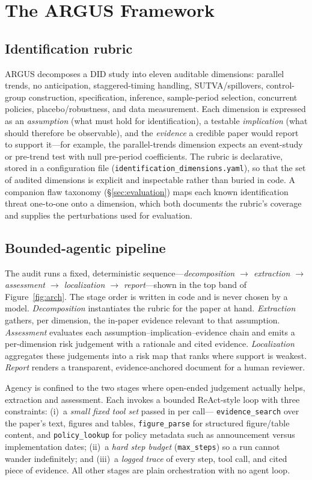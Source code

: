 \section{The ARGUS Framework}
\label{sec:framework}

\subsection{Identification rubric}
ARGUS decomposes a DID study into eleven auditable dimensions: parallel trends,
no anticipation, staggered-timing handling, SUTVA/spillovers, control-group
construction, specification, inference, sample-period selection, concurrent
policies, placebo/robustness, and data measurement. Each dimension is expressed
as an \emph{assumption} (what must hold for identification), a testable
\emph{implication} (what should therefore be observable), and the
\emph{evidence} a credible paper would report to support it---for example, the
parallel-trends dimension expects an event-study or pre-trend test with null
pre-period coefficients. The rubric is declarative, stored in a configuration
file (\texttt{identification\_dimensions.yaml}), so that the set of audited
dimensions is explicit and inspectable rather than buried in code. A companion
flaw taxonomy (\S\ref{sec:evaluation}) maps each known identification threat
one-to-one onto a dimension, which both documents the rubric's coverage and
supplies the perturbations used for evaluation.

\subsection{Bounded-agentic pipeline}
The audit runs a fixed, deterministic sequence---\emph{decomposition
$\rightarrow$ extraction $\rightarrow$ assessment $\rightarrow$ localization
$\rightarrow$ report}---shown in the top band of Figure~\ref{fig:arch}. The stage
order is written in code and is never chosen by a model. \emph{Decomposition}
instantiates the rubric for the paper at hand. \emph{Extraction} gathers, per
dimension, the in-paper evidence relevant to that assumption. \emph{Assessment}
evaluates each assumption--implication--evidence chain and emits a per-dimension
risk judgement with a rationale and cited evidence. \emph{Localization}
aggregates these judgements into a risk map that ranks where support is weakest.
\emph{Report} renders a transparent, evidence-anchored document for a human
reviewer.

Agency is confined to the two stages where open-ended judgement actually helps,
extraction and assessment. Each invokes a bounded ReAct-style loop with three
constraints: (i)~a \emph{small fixed tool set} passed in per call---%
\texttt{evidence\_search} over the paper's text, figures and tables,
\texttt{figure\_parse} for structured figure/table content, and
\texttt{policy\_lookup} for policy metadata such as announcement versus
implementation dates; (ii)~a \emph{hard step budget} (\texttt{max\_steps}) so a
run cannot wander indefinitely; and (iii)~a \emph{logged trace} of every step,
tool call, and cited piece of evidence. All other stages are plain orchestration
with no agent loop.

